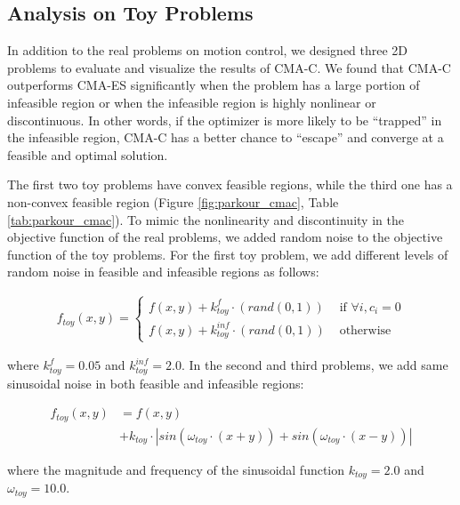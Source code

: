 \subsection{Analysis on Toy Problems}
\label{sec:parkour_toyproblems}
In addition to the real problems on motion control, we
designed three 2D problems to evaluate and visualize the results of
CMA-C. We found that CMA-C outperforms CMA-ES significantly when the
problem has a large portion of infeasible region or when the
infeasible region is highly nonlinear or discontinuous. In other
words, if the optimizer is more likely to be ``trapped'' in the
infeasible region, CMA-C has a better chance to ``escape'' and
converge at a feasible and optimal solution.

The first two toy problems have convex feasible regions, 
  while the third one has a non-convex feasible region (Figure \ref{fig:parkour_cmac}, 
  Table \ref{tab:parkour_cmac}).
To mimic the nonlinearity and discontinuity in the
objective function of the real problems, we added random noise to
the objective function of the toy problems.
For the first toy problem, we add different levels of random noise
  in feasible and infeasible regions as follows:

\begin{equation}
  \begin{aligned}
    f_{toy}(x,y) = 
    \begin{cases}
      f(x,y) + k_{toy}^{f} \cdot ( rand(0, 1) ) &  \text{ if } \forall i, c_i = 0  \\
      f(x,y) + k_{toy}^{inf} \cdot ( rand(0, 1) ) & \text{ otherwise }
    \end{cases}
    \label{eq:parkour_toyerrorfunc}
  \end{aligned}
\end{equation}

where $k_{toy}^{f}=0.05$ and $k_{toy}^{inf}=2.0$.
In the second and third problems, we add same sinusoidal noise 
in both feasible and infeasible regions:

\begin{equation}
  \begin{aligned}
    f_{toy}(x,y) &= f(x,y) \\
    &+ k_{toy} \cdot | sin(\omega_{toy}\cdot(x + y)) + sin(\omega_{toy}\cdot(x - y))|
    \label{eq:parkour_toyerrorfunc2}
  \end{aligned}
\end{equation}

where the magnitude and frequency of the
sinusoidal function $k_{toy}=2.0$ and $\omega_{toy} = 10.0$.


